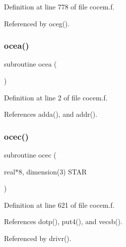Definition at line 778 of file cocem.\+f.



Referenced by oceg().

\mbox{\label{cocem_8f_ad27f5f74f277b21b214051741c9153b8}} 
\subsubsection{\texorpdfstring{ocea()}{ocea()}}
{\footnotesize\ttfamily subroutine ocea (\begin{DoxyParamCaption}{ }\end{DoxyParamCaption})}



Definition at line 2 of file cocem.\+f.



References adda(), and addr().

\mbox{\label{cocem_8f_ab7ac33bca850390c04cef9c971b3aa2a}} 
\subsubsection{\texorpdfstring{ocec()}{ocec()}}
{\footnotesize\ttfamily subroutine ocec (\begin{DoxyParamCaption}\item[{real$\ast$8, dimension(3)}]{S\+T\+AR }\end{DoxyParamCaption})}



Definition at line 621 of file cocem.\+f.



References dotp(), put4(), and vecsb().



Referenced by drivr().

\mbox{\label{cocem_8f_ad3abe403ce2db9218178965a1a37fd08}} 
